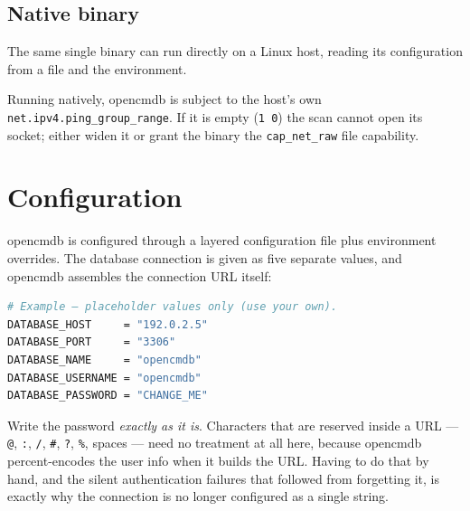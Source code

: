 \documentclass[11pt,oneside,listof=totoc,bibliography=totoc]{scrreprt}
\begin{document}
\section{Native binary}
The same single binary can run directly on a Linux host, reading its configuration from a
file and the environment.

\begin{note}
Running natively, opencmdb is subject to the host's own
\texttt{net.ipv4.ping\_group\_range}. If it is empty (\texttt{1 0}) the scan cannot open its
socket; either widen it or grant the binary the \texttt{cap\_net\_raw} file capability.
\end{note}

\chapter{Configuration}
opencmdb is configured through a layered configuration file plus environment overrides. The
database connection is given as five separate values, and opencmdb assembles the connection URL
itself:

\begin{lstlisting}[language=bash]
# Example — placeholder values only (use your own).
DATABASE_HOST     = "192.0.2.5"
DATABASE_PORT     = "3306"
DATABASE_NAME     = "opencmdb"
DATABASE_USERNAME = "opencmdb"
DATABASE_PASSWORD = "CHANGE_ME"
\end{lstlisting}

Write the password \emph{exactly as it is}. Characters that are reserved inside a URL ---
\texttt{@}, \texttt{:}, \texttt{/}, \texttt{\#}, \texttt{?}, \texttt{\%}, spaces --- need no
treatment at all here, because opencmdb percent-encodes the user info when it builds the URL.
Having to do that by hand, and the silent authentication failures that followed from forgetting
it, is exactly why the connection is no longer configured as a single string.
\end{document}

